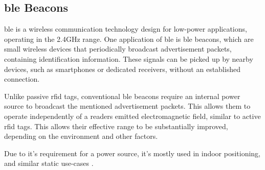 \subsection{\gls{ble} Beacons}
\acrfull{ble} is a wireless communication technology design for low-power applications, operating in the 2.4GHz range. One application of \gls{ble} is \gls{ble} beacons, which are small wireless devices that periodically broadcast advertisement packets, containing identification information. These signals can be picked up by nearby devices, such as smartphones or dedicated receivers, without an established connection.

Unlike passive \gls{rfid} tags, conventional \gls{ble} beacons require an internal power source to broadcast the mentioned advertisement packets. This allows them to operate independently of a readers emitted electromagnetic field, similar to active \gls{rfid} tags. This allows their effective range to be substantially improved, depending on the environment and other factors.

Due to it's requirement for a power source, it's mostly used in indoor positioning, and similar static use-cases \cite{indoor-content-delivery,ble-occupancy-monitoring,ble-indoor-positioning}. 
